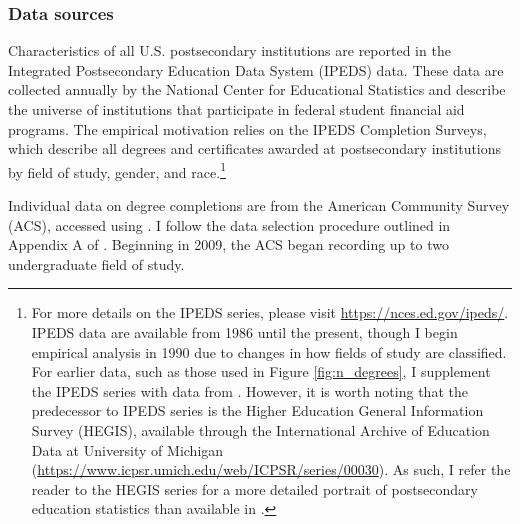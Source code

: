 \documentclass[11 pt]{article}
\begin{document}
\subsubsection*{Data sources}

Characteristics of all U.S. postsecondary institutions are reported in the Integrated Postsecondary Education Data System (IPEDS) data.
These data are collected annually by the National Center for Educational Statistics and describe the universe of institutions that participate in federal student financial aid programs. 
The empirical motivation relies on the IPEDS Completion Surveys, which describe all degrees and certificates awarded at postsecondary institutions by field of study, gender, and race.\footnote{
    For more details on the IPEDS series, please visit \url{https://nces.ed.gov/ipeds/}.
    IPEDS data are available from 1986 until the present, though I begin empirical analysis in 1990 due to changes in how fields of study are classified.
    For earlier data, such as those used in Figure \ref{fig:n_degrees}, I supplement the IPEDS series with data from \textcite{S93}.
    However, it is worth noting that the predecessor to IPEDS series is the Higher Education General Information Survey (HEGIS), available through the International Archive of Education Data at University of Michigan (\url{https://www.icpsr.umich.edu/web/ICPSR/series/00030}). As such, I refer the reader to the HEGIS series for a more detailed portrait of postsecondary education statistics than available in \textcite{S93}.
}

Individual data on degree completions are from the American Community Survey (ACS), accessed using \textcite{IPUMS}.
I follow the data selection procedure outlined in Appendix A of \textcite{SHB19}.
Beginning in 2009, the ACS began recording up to two undergraduate field of study. 


% 



\printbibliography
\end{document}
